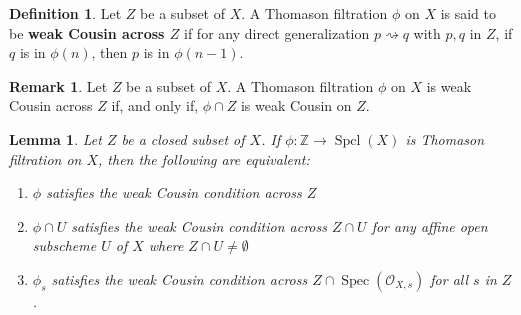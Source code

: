 \documentclass[11pt]{amsart}
\theoremstyle{plain}
\newtheorem{lemma}[theorem]{Lemma}
\theoremstyle{definition}
\newtheorem{definition}[theorem]{Definition}
\newtheorem{remark}[theorem]{Remark}
\numberwithin{equation}{section}
\numberwithin{theorem}{section}
\begin{document}
\begin{definition}\label{def:weak_cousin_relative}
    Let $Z$ be a subset of $X$. A Thomason filtration $\phi$ on $X$ is said to be \textbf{weak Cousin across $Z$} if for any direct generalization  $p \rightsquigarrow q$ with $p,q$ in $Z$, if $q$ is in $\phi (n)$, then $p$ is in $\phi (n-1)$.
\end{definition}

\begin{remark}\label{rmk:weak_cousin_across_to_literal_weak_cousin_on_intersection}
    Let $Z$ be a subset of $X$. A Thomason filtration $\phi$ on $X$ is weak Cousin across $Z$ if, and only if, $\phi\cap Z$ is weak Cousin on $Z$.
\end{remark}

\begin{lemma}\label{lem:weak_cousin_iff_local}
    Let $Z$ be a closed subset of $X$. If $\phi \colon \mathbb{Z} \to \operatorname{Spcl}(X)$ is Thomason filtration on $X$, then the following are equivalent:
    \begin{enumerate}
        \item $\phi$ satisfies the weak Cousin condition across $Z$
        \item $\phi\cap U$ satisfies the weak Cousin condition across $Z \cap U$ for any affine open subscheme $U$ of $X$ where $Z\cap U\not= \emptyset$
        \item $\phi_s$ satisfies the weak Cousin condition across $Z\cap \operatorname{Spec}(\mathcal{O}_{X,s})$ for all $s$ in $Z$.
    \end{enumerate}
\end{lemma}
\end{document}
